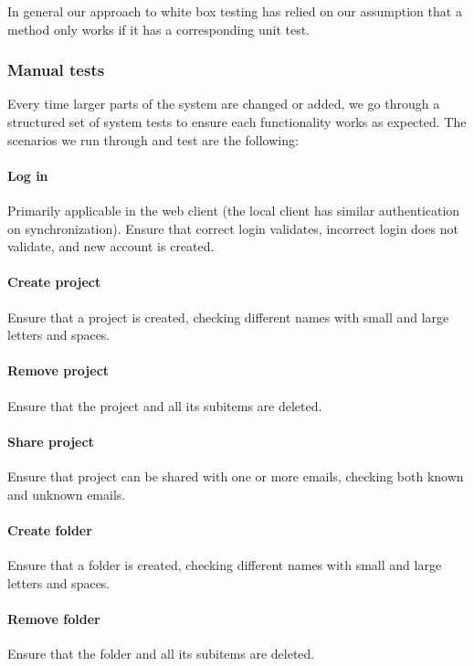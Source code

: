 In general our approach to white box testing has relied on our assumption that a method only works if it has a corresponding unit test.

\subsubsection{Manual tests}
Every time larger parts of the system are changed or added, we go through a structured set of system tests to ensure each functionality works as expected. The scenarios we run through and test are the following:

	\paragraph{Log in}
	Primarily applicable in the web client (the local client has similar authentication on synchronization). Ensure that correct login validates, incorrect login does not validate, and new account is created.

	\paragraph{Create project}
	Ensure that a project is created, checking different names with small and large letters and spaces.

	\paragraph{Remove project}
	Ensure that the project and all its subitems are deleted.

	\paragraph{Share project}
	Ensure that project can be shared with one or more emails, checking both known and unknown emails.

	\paragraph{Create folder}
	Ensure that a folder is created, checking different names with small and large letters and spaces.

	\paragraph{Remove folder}
	Ensure that the folder and all its subitems are deleted.

